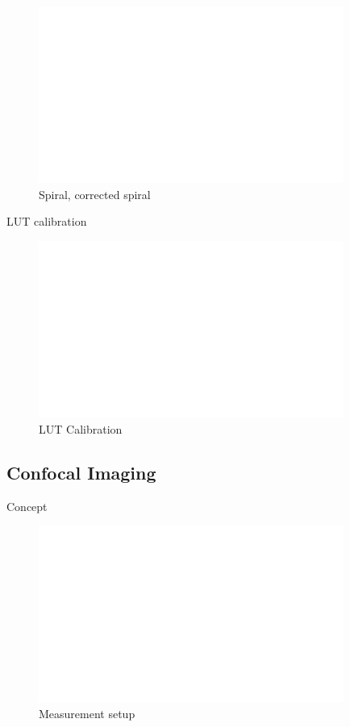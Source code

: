 \begin{figure}[h!]\centering \includegraphics[width=10cm,draft]{figures/foo.png}
      \caption{Spiral, corrected spiral}
\end{figure}
      
LUT calibration

\begin{figure}[h!]\centering \includegraphics[width=10cm,draft]{figures/foo.png}
      \caption{LUT Calibration}
\end{figure}


\clearpage
\subsection{Confocal Imaging}
Concept

\begin{figure}[h!]\centering \includegraphics[width=10cm,draft]{figures/foo.png}
      \caption{Measurement setup}
\end{figure}

